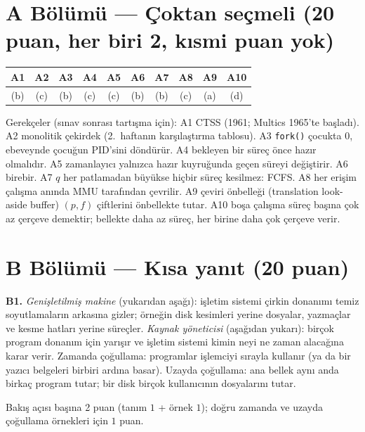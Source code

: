 \documentclass[11pt,a4paper]{article}
\newcommand{\cmd}[1]{\texttt{#1}}
\begin{document}
\section*{A Bölümü --- Çoktan seçmeli (20 puan, her biri 2, kısmi puan yok)}
\begin{center}
\renewcommand{\arraystretch}{1.3}
\begin{tabular}{@{}*{10}{c}@{}}
\toprule
A1 & A2 & A3 & A4 & A5 & A6 & A7 & A8 & A9 & A10 \\
\midrule
(b) & (c) & (b) & (c) & (c) & (b) & (b) & (c) & (a) & (d) \\
\bottomrule
\end{tabular}
\end{center}
Gerekçeler (sınav sonrası tartışma için): A1 CTSS (1961; Multics 1965'te başladı). A2 monolitik çekirdek (2.~haftanın karşılaştırma tablosu). A3 \cmd{fork()} çocukta $0$, ebeveynde çocuğun PID'sini döndürür. A4 bekleyen bir süreç önce hazır olmalıdır. A5 zamanlayıcı yalnızca hazır kuyruğunda geçen süreyi değiştirir. A6 birebir. A7 $q$ her patlamadan büyükse hiçbir süreç kesilmez: FCFS. A8 her erişim çalışma anında MMU tarafından çevrilir. A9 çeviri önbelleği (translation look-aside buffer) $(p, f)$ çiftlerini önbellekte tutar. A10 boşa çalışma süreç başına çok az çerçeve demektir; bellekte daha az süreç, her birine daha çok çerçeve verir.

\section*{B Bölümü --- Kısa yanıt (20 puan)}
\textbf{B1.} \emph{Genişletilmiş makine} (yukarıdan aşağı): işletim sistemi çirkin donanımı temiz soyutlamaların arkasına gizler; örneğin disk kesimleri yerine dosyalar, yazmaçlar ve kesme hatları yerine süreçler. \emph{Kaynak yöneticisi} (aşağıdan yukarı): birçok program donanım için yarışır ve işletim sistemi kimin neyi ne zaman alacağına karar verir. Zamanda çoğullama: programlar işlemciyi sırayla kullanır (ya da bir yazıcı belgeleri birbiri ardına basar). Uzayda çoğullama: ana bellek aynı anda birkaç program tutar; bir disk birçok kullanıcının dosyalarını tutar.
\begin{rubric}Bakış açısı başına 2 puan (tanım $1$ + örnek $1$); doğru zamanda ve uzayda çoğullama örnekleri için $1$ puan.\end{rubric}
\end{document}
